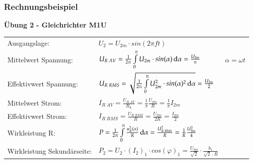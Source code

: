 \subsubsection{Rechnungsbeispiel}
\textbf{Übung 2 - Gleichrichter M1U}\newline
\renewcommand{\arraystretch}{1.3}
\begin{tabular}{ p{}  p{}  p{}}
    Ausgangslage:&
    $ U_2= U_{2m}\cdot sin(2\pi ft)$&
    \\
    Mittelwert Spannung: &
    $ U_{R \; AV}= \frac{1}{2 \pi} \int\limits_{0}^{\pi} U_{2m}\cdot sin(\alpha)\mathop{}\!\mathrm{d}\alpha=\frac{U_{2m}}{\pi} $ &
    $ \alpha=\omega t $
    \\
    
    Effektivwert Spannung:   &
    $ U_{R \; RMS}= \sqrt{\frac{1}{2 \pi}\int\limits_{0}^{\pi} U_{2m}^2\cdot sin(\alpha)^2\mathop{}\!\mathrm{d}\alpha} = \frac{U_{2m}}{2} $ &
    \\ 
    
    Mittelwert Strom: &
    $ I_{R \; AV}=\frac{U_{R \; AV}}{R_L}= \frac{1}{\pi}\frac{U_{2m}}{R}= \frac{1}{\pi} I_{2m} $ &
    \\
    
    Effektivwert Strom: &
    $ I_{R \; RMS}=\frac{U_{R \; RMS}}{R}= \frac{U_{2m}}{2R}= \frac{I_{2m}}{2} $ &
    \\
    
    Wirkleistung R: &
    $ P= \frac{1}{2\pi}\int\limits_{0}^{\pi}\frac{u_R^2(\alpha)}{R} \mathop{}\!\mathrm{d} \alpha = \frac{U_{R \; RMS}^2}{R}=\frac{1}{R}\frac{U_{2m}^2}{4} $&
    \\
    
    Wirkleistung Sekundärseite: &
    $P_2 = U_2 \cdot (I_2)_1 \cdot cos(\varphi)_1 = \frac{U_{2m}}{\sqrt{2}} \cdot \frac{b_1}{\sqrt{2} \cdot R}$&
    \\
\end{tabular}
\renewcommand{\arraystretch}{1}

\clearpage

